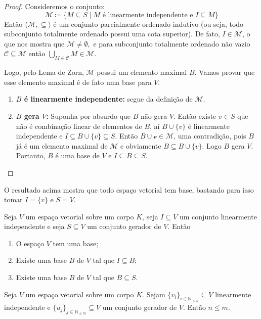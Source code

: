 \documentclass[11pt,twoside,a4paper]{book}
\begin{document}
\begin{proof}
Consideremos o   conjunto:
\[
\mathcal{M}\coloneqq\{M\subseteq S\mid M\text{ é linearmente independente e }I\subseteq M\}
\]
Então $\langle \mathcal{M},\subseteq \rangle$ é um conjunto parcialmente ordenado indutivo (ou seja, todo subconjunto totalmente ordenado possui uma cota superior). De fato, $I\in\mathcal{M}$, o que nos mostra que $\mathcal{M} \neq \emptyset,$ e para subconjunto totalmente ordenado não vazio $\mathcal{C}\subseteq\mathcal{M}$ então $\bigcup\limits_{M \in \mathcal{C}} M \in\mathcal{M}.$ 

Logo, pelo Lema de Zorn, $\mathcal{M}$ possui um elemento maximal $B$. Vamos provar que esse elemento maximal é de fato uma base para $V.$
\begin{enumerate}[label=(\roman*)]
    \item \textbf{$B$ é linearmente independente:} segue da definição de $\mathcal{M}.$
    \item \textbf{$B$ gera $V$:} Suponha por absurdo que $B$ não gera $V$. Então existe $v\in S$ que não é combinação linear de elementos de $B$, aí $B\cup\{v\}$ é linearmente independente e $I\subseteq B\cup\{v\}\subseteq S$. Então $B\cup\mathcal{v}\in\mathcal{M}$, uma contradição, pois $B$ já é um elemento maximal de $\mathcal{M}$ e obviamente $B \subseteq B \cup \{ v \}$. Logo $B$ gera $V$. Portanto, $B$ é uma base de $V$ e $I\subseteq B\subseteq S$.\qedhere
    \end{enumerate}
\end{proof}

O resultado acima mostra que todo espaço vetorial tem base, bastando para isso tomar $I = \{ v \}$ e $S = V.$
\begin{corolario}
  Seja \(V\) um espaço vetorial sobre um corpo \(K\),
  seja \(I\subseteq V\) um
  conjunto linearmente independente e seja \(S\subseteq V\)
  um conjunto gerador de \(V\). Então
\begin{enumerate}[label=(\roman*)]
\item O espaço $V$ tem uma base;
\item Existe uma base \(B\) de \(V\) tal que \(I\subseteq B\); 
\item Existe uma base \(B\) de \(V\) tal que \(B\subseteq S\).
\end{enumerate}
\end{corolario}


\begin{lema} Seja \(V\) um espaço vetorial sobre um corpo \(K\).
Sejam $\{v_i\}_{i \in \mathbb{N}_{\le n}}\subseteq V$ linearmente independente e
$\{u_j\}_{j\in \mathbb{N}_{\le m}}\subseteq V$ um conjunto gerador de $V$. Então $n\leq m$.
\end{lema}
\end{document}
